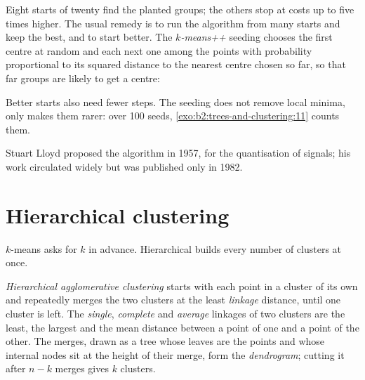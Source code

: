 Eight starts of twenty find the planted groups; the others stop at costs up to five times higher. The usual remedy is to
run the algorithm from many starts and keep the best, and to start better. The \emph{$k$-means++}
seeding chooses the first centre at random and each next one among the points with probability proportional to its
squared distance to the nearest centre chosen so far, so that far groups are likely to get a centre:

\label{lst:b2:trees-and-clustering:kmeanspp}

\label{out:b2:trees-and-clustering:kmeanspp}

Better starts also need fewer steps. The seeding does not remove local minima, only makes them rarer: over 100 seeds,
\cref{exo:b2:trees-and-clustering:11} counts them.

\begin{history}
Stuart Lloyd proposed the algorithm in 1957, for the quantisation of signals; his work circulated widely but was
published only in 1982.
\end{history}

\section{Hierarchical clustering}\label{sec:b2:trees-and-clustering:hac}

$k$-means asks for $k$ in advance. Hierarchical  builds every number of clusters at once.

\begin{definition}\label{def:b2:trees-and-clustering:hac}
\emph{Hierarchical agglomerative clustering} starts with each point in a
cluster of its own and repeatedly merges the two clusters at the least \emph{linkage} distance, until one
cluster is left. The \emph{single}, \emph{complete} and \emph{average} linkages of two clusters are the least, the
largest and the mean distance between a point of one and a point of the other. The merges, drawn as a tree whose leaves
are the points and whose internal nodes sit at the height of their merge, form the
\emph{dendrogram}; cutting it after $n - k$ merges gives $k$ clusters.
\end{definition}

